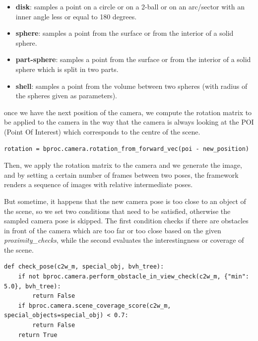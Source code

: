 \begin{itemize}
    \item \textbf{disk}: samples a point on a circle or on a 2-ball or on an arc/sector with an inner angle less or equal to 180 degrees.
    \item \textbf{sphere}: samples a point from the surface or from the interior of a solid sphere.
    \item \textbf{part-sphere}: samples a point from the surface or from the interior of a solid sphere which is split in two parts.
    \item \textbf{shell}: samples a point from the volume between two spheres (with radius of the spheres given as parameters).
\end{itemize}
once we have the next position of the camera, we compute the rotation matrix to be applied to the camera in the way that the camera is always looking at the POI (Point Of Interest) which corresponds to the centre of the scene.
\begin{lstlisting}[label={lst:compute-camera-rotation}, caption={Computes the rotatition matrix for the camera.}, captionpos=b]
rotation = bproc.camera.rotation_from_forward_vec(poi - new_position)
\end{lstlisting}
Then, we apply the rotation matrix to the camera and we generate the image, and by setting a certain number of frames between two poses, the framework renders a sequence of images with relative intermediate poses.


But sometime, it happens that the new camera pose is too close to an object of the scene, so we set two conditions that need to be satisfied, otherwise the sampled camera pose is skipped.
The first condition checks if there are obstacles in front of the camera which are too far or too close based on the given \textit{proximity\_checks}, while the second evaluates the interestingness or coverage of the scene.
\begin{lstlisting}[label={lst:lstlisting}, caption={Checks whether the camera pose satisfies the conditions.}, captionpos=b]
def check_pose(c2w_m, special_obj, bvh_tree):
    if not bproc.camera.perform_obstacle_in_view_check(c2w_m, {"min": 5.0}, bvh_tree):
        return False
    if bproc.camera.scene_coverage_score(c2w_m, special_objects=special_obj) < 0.7:
        return False
    return True
\end{lstlisting}


